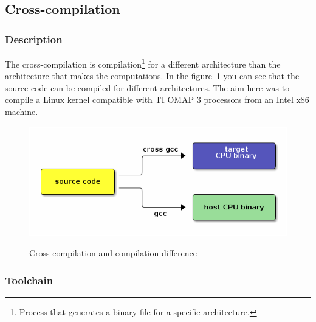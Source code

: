 	\subsection{Cross-compilation}
	\subsubsection{Description}
	\par The cross-compilation is compilation\footnote{Process that generates a binary file for a specific architecture.} for a different architecture than the architecture that makes the computations. In the figure~\ref{cross} you can see that the source code can be compiled for different architectures. The aim here was to compile a Linux kernel compatible with TI OMAP 3 processors from an Intel x86 machine.
	\begin{figure}[h]
		\begin{center}
			\includegraphics[scale=0.5]{images_not_compressed/cross-compile.png}
			\label{cross}
			\caption{Cross compilation and compilation difference}
		\end{center}
	\end{figure}


\subsubsection{Toolchain}
	
